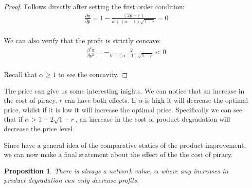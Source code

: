 \documentclass[12pt]{report}
\newtheorem{proposition}{Proposition}
\numberwithin{equation}{section}
\begin{document}
\begin{proof}
Follows directly after setting the first order condition:
\begin{align*} \label{FOC}
\frac{\partial \pi }{\partial p} = 1-\frac{ (2p-r)}{
k+ (\alpha-1)\sqrt{ 1 -r }} =0\\
\end{align*}

We can also verify that the profit is strictly concave: 
\begin{align*}
\frac{\partial^2 \pi }{\partial p^2}
= -\frac{ 2}{
k+ (\alpha-1)\sqrt{ 1 -r }} < 0 \\
\end{align*}

Recall that $\alpha \geq 1$ to see the concavity. 
\end{proof}

The price can give us some interesting inights. We can notice that an increase in the cost of piracy, $r$ can have both effects. If $\alpha$ is high it will decrease the optimal price, whilst if it is low it will increase the optimal price.  Specifically we can see that if $\alpha> 1+2 \sqrt{1-r}$, an increase in the cost of product degradation will decrease the price level. 






Since have a general idea of the comparative statics of the product improvement, we can now make a final statement about the effect of the the cost of piracy. 

\begin{proposition}
There is always a network value, $\alpha$ where any increases in product degradation can only decrease profits.
\end{proposition}
\end{document}
